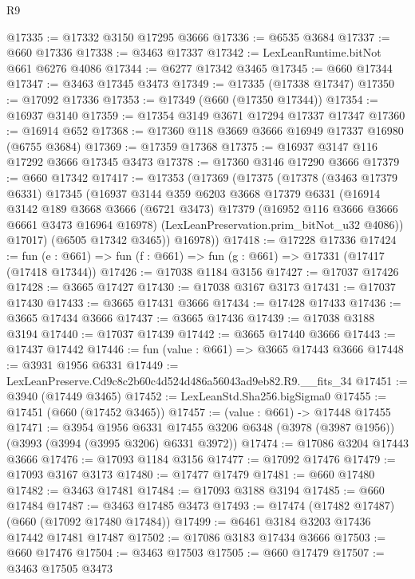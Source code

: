 \begin{lexlean}{R9}
\begin{coremodule}
@17335 := @17332 @3150 @17295 @3666
@17336 := @6535 @3684
@17337 := @660 @17336
@17338 := @3463 @17337
@17342 := LexLeanRuntime.bitNot @661 @6276 @4086
@17344 := @6277 @17342 @3465
@17345 := @660 @17344
@17347 := @3463 @17345 @3473
@17349 := @17335 (@17338 @17347)
@17350 := @17092 @17336
@17353 := @17349 (@660 (@17350 @17344))
@17354 := @16937 @3140
@17359 := @17354 @3149 @3671 @17294 @17337 @17347
@17360 := @16914 @652
@17368 := @17360 @118 @3669 @3666 @16949 @17337 @16980 (@6755 @3684)
@17369 := @17359 @17368
@17375 := @16937 @3147 @116 @17292 @3666 @17345 @3473
@17378 := @17360 @3146 @17290 @3666
@17379 := @660 @17342
@17417 := @17353
    (@17369
      (@17375
        (@17378
          (@3463 @17379 @6331)
          @17345
          (@16937
            @3144
            @359
            @6203
            @3668
            @17379
            @6331
            (@16914
              @3142
              @189
              @3668
              @3666
              (@6721 @3473)
              @17379
              (@16952 @116 @3666 @3666 @6661 @3473 @16964 @16978)
              (LexLeanPreservation.prim_bitNot_u32 @4086))
            @17017)
          (@6505 @17342 @3465))
        @16978))
@17418 := @17228 @17336
@17424 := fun (e : @661) => fun (f : @661) => fun (g : @661) => @17331 (@17417 (@17418 @17344))
@17426 := @17038 @1184 @3156
@17427 := @17037 @17426
@17428 := @3665 @17427
@17430 := @17038 @3167 @3173
@17431 := @17037 @17430
@17433 := @3665 @17431 @3666
@17434 := @17428 @17433
@17436 := @3665 @17434 @3666
@17437 := @3665 @17436
@17439 := @17038 @3188 @3194
@17440 := @17037 @17439
@17442 := @3665 @17440 @3666
@17443 := @17437 @17442
@17446 := fun (value : @661) => @3665 @17443 @3666
@17448 := @3931 @1956 @6331
@17449 := LexLeanPreserve.Cd9c8c2b60c4d524d486a56043ad9eb82.R9.__fits_34
@17451 := @3940 (@17449 @3465)
@17452 := LexLeanStd.Sha256.bigSigma0
@17455 := @17451 (@660 (@17452 @3465))
@17457 := (value : @661) -> @17448 @17455
@17471 := @3954
    @1956
    @6331
    @17455
    @3206
    @6348
    (@3978 (@3987 @1956))
    (@3993 (@3994 (@3995 @3206) @6331 @3972))
@17474 := @17086 @3204 @17443 @3666
@17476 := @17093 @1184 @3156
@17477 := @17092 @17476
@17479 := @17093 @3167 @3173
@17480 := @17477 @17479
@17481 := @660 @17480
@17482 := @3463 @17481
@17484 := @17093 @3188 @3194
@17485 := @660 @17484
@17487 := @3463 @17485 @3473
@17493 := @17474 (@17482 @17487) (@660 (@17092 @17480 @17484))
@17499 := @6461 @3184 @3203 @17436 @17442 @17481 @17487
@17502 := @17086 @3183 @17434 @3666
@17503 := @660 @17476
@17504 := @3463 @17503
@17505 := @660 @17479
@17507 := @3463 @17505 @3473

\end{coremodule}
\end{lexlean}
